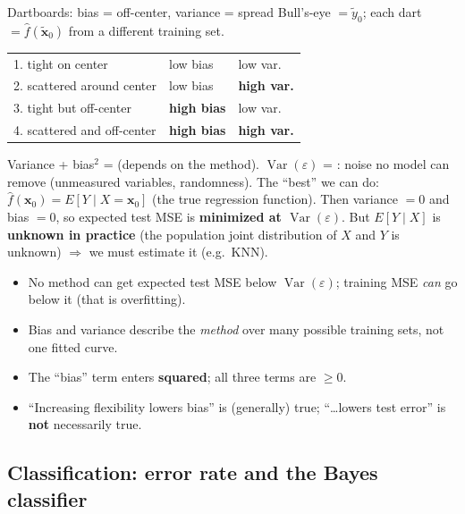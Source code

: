\begin{topic}{Dartboards: bias = off-center, variance = spread }
Bull's-eye $=\tilde y_0$; each dart $=\hat f(\tilde{\mathbf x}_0)$ from a different training set.
\begin{tabular}{@{}lll@{}}
1. tight on center & low bias & low var.\\
2. scattered around center & low bias & \textbf{high var.}\\
3. tight but off-center & \textbf{high bias} & low var.\\
4. scattered and off-center & \textbf{high bias} & \textbf{high var.}
\end{tabular}
\end{topic}

\begin{keybox}
Variance + bias$^2$ = \textbf{} (depends on the method). $\operatorname{Var}(\varepsilon)$ = \textbf{}: noise no model can remove (unmeasured variables, randomness).
The ``best'' we can do: $\hat f(\mathbf x_0)=E[Y\mid X=\mathbf x_0]$ (the true regression function). Then variance $=0$ and bias $=0$, so expected test MSE is \textbf{minimized at $\operatorname{Var}(\varepsilon)$}. But $E[Y\mid X]$ is \textbf{unknown in practice} (the population joint distribution of $X$ and $Y$ is unknown) $\Rightarrow$ we must estimate it (e.g.\ KNN).
\end{keybox}

\begin{trap}
\begin{itemize}
\item No method can get expected test MSE below $\operatorname{Var}(\varepsilon)$; training MSE \emph{can} go below it (that is overfitting).
\item Bias and variance describe the \emph{method} over many possible training sets, not one fitted curve.
\item The ``bias'' term enters \textbf{squared}; all three terms are $\ge0$.
\item ``Increasing flexibility lowers bias'' is (generally) true; ``\dots lowers test error'' is \textbf{not} necessarily true.
\end{itemize}
\end{trap}

\subsection{Classification: error rate and the Bayes classifier}

